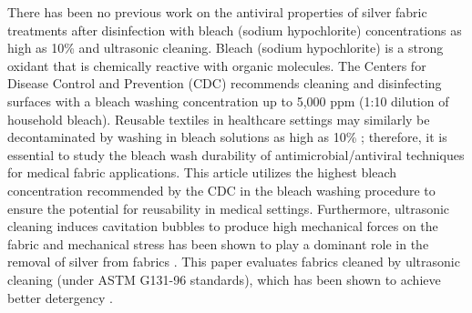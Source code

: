 \documentclass[10pt,letterpaper]{article}
\begin{document}


There has been no previous work on the 
antiviral properties of silver fabric treatments after disinfection with bleach (sodium hypochlorite) concentrations as high as 10\% and ultrasonic cleaning.  
Bleach (sodium hypochlorite) is a strong oxidant that is chemically reactive with organic molecules. \cite{eleni:2013,farr:2003} %
The Centers for Disease Control and Prevention (CDC) recommends cleaning and disinfecting surfaces with a bleach washing concentration up to 5,000 ppm (1:10 dilution of household bleach).\cite{cdc:1987}
Reusable textiles in healthcare settings may similarly be decontaminated by washing in bleach solutions as high as 10\% \cite{Cintas,cdc:1987}; therefore, it is essential to study the bleach wash durability of antimicrobial/antiviral techniques for medical fabric applications. 
This article utilizes the highest bleach concentration recommended by the CDC in the bleach washing procedure to ensure the potential for reusability in medical settings. 
Furthermore, ultrasonic cleaning induces cavitation bubbles to
produce high mechanical forces on the fabric \cite{Fuchs:15} and
mechanical stress has %
been shown to play a dominant role in the removal of silver from fabrics
\cite{geranio:2009}. This paper evaluates fabrics cleaned by ultrasonic cleaning (under 
ASTM G131-96 standards), 
which has been shown to 
achieve better detergency
\cite{Gallego-juarez:10}.
\end{document}
